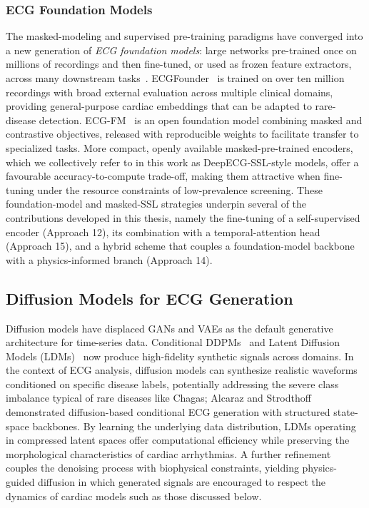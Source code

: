 \subsubsection{ECG Foundation Models}

The masked-modeling and supervised pre-training paradigms have converged into a new generation of \emph{ECG foundation models}: large networks pre-trained once on millions of recordings and then fine-tuned, or used as frozen feature extractors, across many downstream tasks~\cite{song2024foundation}. ECGFounder~\cite{li2024ecgfounder} is trained on over ten million recordings with broad external evaluation across multiple clinical domains, providing general-purpose cardiac embeddings that can be adapted to rare-disease detection. ECG-FM~\cite{mckeen2024ecgfm} is an open foundation model combining masked and contrastive objectives, released with reproducible weights to facilitate transfer to specialized tasks. More compact, openly available masked-pre-trained encoders, which we collectively refer to in this work as DeepECG-SSL-style models, offer a favourable accuracy-to-compute trade-off, making them attractive when fine-tuning under the resource constraints of low-prevalence screening. These foundation-model and masked-SSL strategies underpin several of the contributions developed in this thesis, namely the fine-tuning of a self-supervised encoder (Approach 12), its combination with a temporal-attention head (Approach 15), and a hybrid scheme that couples a foundation-model backbone with a physics-informed branch (Approach 14).

\subsection{Diffusion Models for ECG Generation}

Diffusion models have displaced GANs and VAEs as the default generative architecture for time-series data. Conditional DDPMs~\cite{ho2020denoising} and Latent Diffusion Models (LDMs)~\cite{rombach2022highresolution} now produce high-fidelity synthetic signals across domains. In the context of ECG analysis, diffusion models can synthesize realistic waveforms conditioned on specific disease labels, potentially addressing the severe class imbalance typical of rare diseases like Chagas; Alcaraz and Strodthoff~\cite{alcaraz2023diffusion} demonstrated diffusion-based conditional ECG generation with structured state-space backbones. By learning the underlying data distribution, LDMs operating in compressed latent spaces offer computational efficiency while preserving the morphological characteristics of cardiac arrhythmias. A further refinement couples the denoising process with biophysical constraints, yielding physics-guided diffusion in which generated signals are encouraged to respect the dynamics of cardiac models such as those discussed below.

